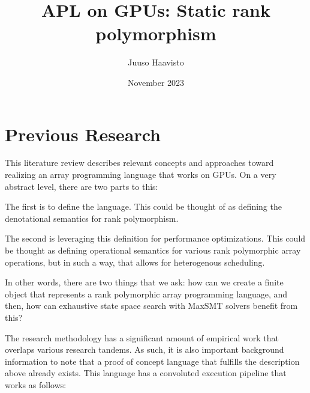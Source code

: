 \documentclass[10pt,a4paper]{article}
\date{November 2023}
\title{APL on GPUs: Static rank polymorphism}
\author{Juuso Haavisto}
\begin{document}



\section{Previous Research}

This literature review describes relevant concepts and approaches toward realizing an array programming language that works on GPUs.
On a very abstract level, there are two parts to this:

The first is to define the language. This could be thought of as defining the denotational semantics for rank polymorphism.

The second is leveraging this definition for performance optimizations. This could be thought as defining operational semantics for various rank polymorphic array operations, but in such a way, that allows for heterogenous scheduling.

In other words, there are two things that we ask: how can we create a finite object that represents a rank polymorphic array programming language, and then, how can exhaustive state space search with MaxSMT solvers benefit from this?

The research methodology has a significant amount of empirical work that overlaps various research tandems. As such, it is also important background information to note that a proof of concept language that fulfills the description above already exists. This language has a convoluted execution pipeline that works as follows:
\end{document}

